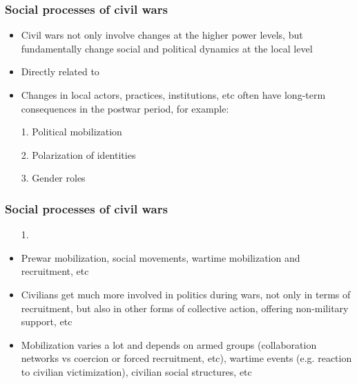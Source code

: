 \documentclass[aspectratio=43]{beamer}
\begin{document}
\begin{frame}
\frametitle{Social processes of civil wars}
\centering

\begin{itemize}[<+->]
  \item Civil wars not only involve changes at the higher power levels, but fundamentally change social and political dynamics at the local level
  \item Directly related to {\color{red}{civilians}}
  \item Changes in local actors, practices, institutions, etc often have long-term consequences in the postwar period, for example:
  \item[1.] Political mobilization
  \item[2.] Polarization of identities
  \item[3.] Gender roles
\end{itemize}

\end{frame}

\begin{frame}
\frametitle{Social processes of civil wars}
\centering

\begin{itemize}[<+->]
  \item[1.] {\color{red}{Political mobilization}}
  \item Prewar mobilization, social movements, wartime mobilization and recruitment, etc
  \item Civilians get much more involved in politics during wars, not only in terms of recruitment, but also in other forms of collective action, offering non-military support, etc
  \item Mobilization varies a lot and depends on armed groups (collaboration networks vs coercion or forced recruitment, etc), wartime events (e.g. reaction to civilian victimization), civilian social structures, etc
\end{itemize}

\end{frame}
\end{document}

